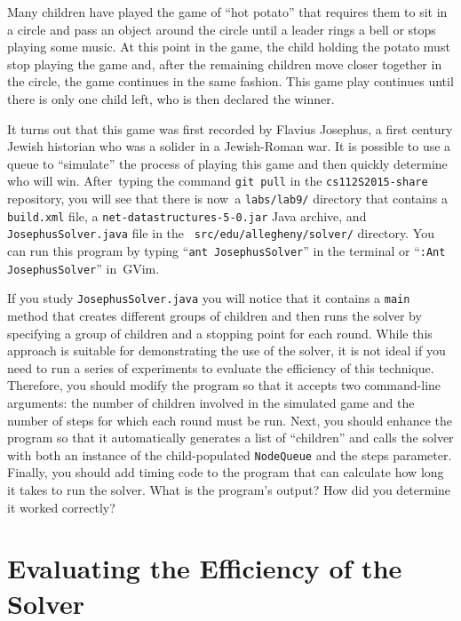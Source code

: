   Many children have played the game of ``hot potato'' that requires them to sit in a circle and pass an object around
  the circle until a leader rings a bell or stops playing some music.  At this point in the game, the child holding the
  potato must stop playing the game and, after the remaining children move closer together in the circle, the game
  continues in the same fashion. This game play continues until there is only one child left, who is then declared the
  winner.

  It turns out that this game was first recorded by Flavius Josephus, a first century Jewish historian who was a solider
  in a Jewish-Roman war.  It is possible to use a queue to ``simulate'' the process of playing this game and then
  quickly determine who will win.  \mbox{After typing} the command {\tt git pull} in the {\tt cs112S2015-share}
  repository, you will see that there is \mbox{now a} {\tt labs/lab9/} directory that contains a {\tt build.xml} file, a
  {\tt net-datastructures-5-0.jar} Java archive, and {\tt JosephusSolver.java} file in the {\tt
    src/edu/allegheny/solver/} directory.  You can run this program by typing ``{\tt ant JosephusSolver}'' in the terminal
  or ``{\tt :Ant JosephusSolver}'' \mbox{in GVim}.

  If you study {\tt JosephusSolver.java} you will notice that it contains a {\tt main} method that creates different
  groups of children and then runs the solver by specifying a group of children and a stopping point for each round.
  While this approach is suitable for demonstrating the use of the solver, it is not ideal if you need to run a series
  of experiments to evaluate the efficiency of this technique. Therefore, you should modify the program so that it
  accepts two command-line arguments: the number of children involved in the simulated game and the number of steps for
  which each round must be run. Next, you should enhance the program so that it automatically generates a list of
  ``children'' and calls the solver with both an instance of the child-populated {\tt NodeQueue} and the steps
  parameter. Finally, you should add timing code to the program that can calculate how long it takes to run the solver.
  What is the program's output? How did you determine it worked correctly?

\section*{Evaluating the Efficiency of the Solver}


